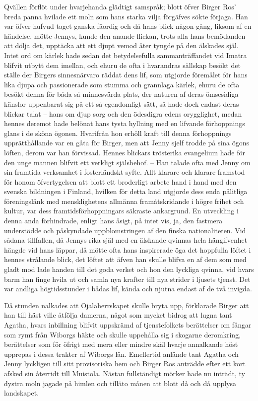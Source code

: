 Qvällen förflöt under hvarjehanda glädtigt samspråk; blott öfver Birger
Ros' breda panna hvilade ett moln som hans starka vilja förgäfves sökte
förjaga. Han var öfver hufvud taget ganska fåordig och då hans blick
någon gång, liksom af en händelse, mötte Jennys, kunde den anande
flickan, trots alla hans bemödanden att dölja det, upptäcka att ett
djupt vemod åter tyngde på den älskades själ. Intet ord om kärlek hade
sedan det betydelsefulla sammanträffandet vid Imatra blifvit utbytt dem
imellan, och ehuru de ofta i hvarandras sällskap besökt det ställe der
Birgers sinnesnärvaro räddat dens lif, som utgjorde föremålet för hans
lika djupa och passionerade som stumma och grannlaga kärlek, ehuru de
ofta besökt denna för båda så minnesvärda plats, der naturen af deras
ömsesidiga känslor uppenbarat sig på ett så egendomligt sätt, så hade
dock endast deras blickar talat -- hans om djup sorg och den ödesdigra
edens orygglighet, medan hennes deremot hade belönat hans tysta hyllning
med en lifvande förhoppnings glans i de sköna ögonen. Hvarifrån hon
erhöll kraft till denna förhoppnings upprätthållande var en gåta för
Birger, men att Jenny sjelf trodde på sina ögons löften, derom var han
förvissad. Hennes blickars trösterika evangelium hade för den unge
mannen blifvit ett verkligt själsbehof. -- Han talade ofta med Jenny om
sin framtida verksamhet i fosterländskt syfte. Allt klarare och klarare
framstod för honom öfvertygelsen att blott ett broderligt arbete hand i
hand med den svenska bildningen i Finland, hvilken för detta land
utgjorde dess enda pålitliga föreningslänk med mensklighetens allmänna
framåtskridande i högre frihet och kultur, var dess
framtidsförhoppningars säkraste ankargrund. En utveckling i denna anda
förhindrade, enligt hans åsigt, på intet vis, ja, den fastmera
understödde och påskyndade uppblomstringen af den finska nationaliteten.
Vid sådana tillfallen, då Jennys rika själ med en älskande qvinnas hela
hängifvenhet hängde vid hans läppar, då mötte ofta hans inspirerade öga
det hoppfulla löftet i hennes strålande blick, det löftet att äfven han
skulle blifva en af dem som med gladt mod lade handen till det goda
verket och hon den lyckliga qvinna, vid hvars barm han finge hvila ut
och samla nya krafter till nya strider i ljusets tjenst. Det var andliga
högtidsstunder i bådas lif, kända och njutna endast af de två invigda.

Då stunden nalkades att Ojalaherrskapet skulle bryta upp, förklarade
Birger att han till häst ville åtfölja damerna, något som mycket bidrog
att lugna tant Agatha, hvars inbillning blifvit uppskrämd af
tjenstefolkets berättelser om fångar som rymt från Wiborgs häkte och
skulle uppehålla sig i skogarne deromkring, berättelser som för öfrigt
med mera eller mindre skäl hvarje annalkande höst upprepas i dessa
trakter af Wiborgs län. Emellertid anlände tant Agatha och Jenny
lyckligen till sitt provisoriska hem och Birger Ros anträdde efter ett
kort afsked sin återridt till Muistola. Nästan fullständigt mörker hade
nu inträdt, ty dystra moln jagade på himlen och tilläto månen att blott
då och då upplysa landskapet.

